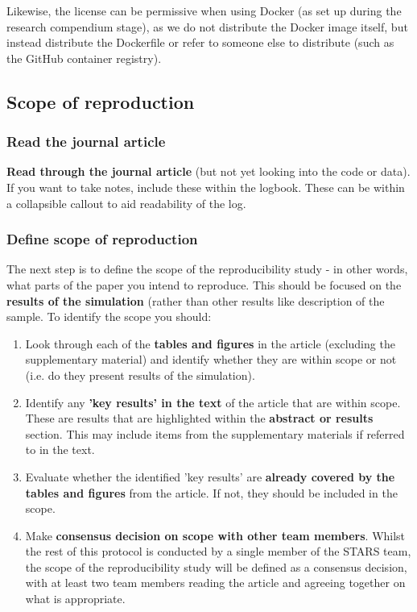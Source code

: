 Likewise, the license can be permissive when using Docker (as set up during the research compendium stage), as we do not distribute the Docker image itself, but instead distribute the Dockerfile or refer to someone else to distribute (such as the GitHub container registry).\autocite{the_linux_foundation_docker_nodate}

\vspace{0.5cm}
\subsection{Scope of reproduction}

\subsubsection{Read the journal article}

\textbf{Read through the journal article} (but not yet looking into the code or data). If you want to take notes, include these within the logbook. These can be within a collapsible callout to aid readability of the log.

\vspace{0.5cm}
\subsubsection{Define scope of reproduction}

The next step is to define the scope of the reproducibility study - in other words, what parts of the paper you intend to reproduce. This should be focused on the \textbf{results of the simulation} (rather than other results like description of the sample. To identify the scope you should:

\begin{enumerate}
    \item Look through each of the \textbf{tables and figures} in the article (excluding the supplementary material) and identify whether they are within scope or not (i.e. do they present results of the simulation).
    \item Identify any \textbf{'key results' in the text} of the article that are within scope. These are results that are highlighted within the \textbf{abstract or results} section. This may include items from the supplementary materials if referred to in the text.
    \item Evaluate whether the identified 'key results' are \textbf{already covered by the tables and figures} from the article. If not, they should be included in the scope.
    \item Make \textbf{consensus decision on scope with other team members}. Whilst the rest of this protocol is conducted by a single member of the STARS team, the scope of the reproducibility study will be defined as a consensus decision, with at least two team members reading the article and agreeing together on what is appropriate.
\end{enumerate}

